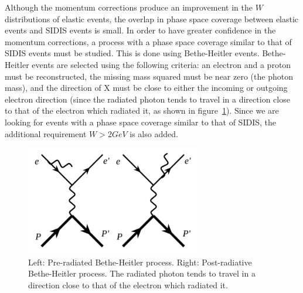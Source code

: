 Although the momentum corrections produce an improvement in the $W$ distributions of elastic events, the overlap in phase space coverage between elastic events and SIDIS events is small.
In order to have greater confidence in the momentum corrections, a process with a phase space coverage similar to that of SIDIS events must be studied.
This is done using Bethe-Heitler events.
Bethe-Heitler events are selected using the following criteria: an electron and a proton must be reconstructed, the missing mass squared must be near zero (the photon mass), and the direction of X must be close to either the incoming or outgoing electron direction (since the radiated photon tends to travel in a direction close to that of the electron which radiated it, as shown in figure~\ref{fig:BetheHeitlerDiagrams}).
Since we are looking for events with a phase space coverage similar to that of SIDIS, the additional requirement $W > 2 GeV$ is also added.
%
\begin{figure}[htp]
\centering
\includegraphics[width=3in]{figures/BetheHeitlerDiagrams.png}
\caption{Left: Pre-radiated Bethe-Heitler process. Right: Post-radiative Bethe-Heitler process. The radiated photon tends to travel in a direction close to that of the electron which radiated it.}
\label{fig:BetheHeitlerDiagrams}
\end{figure}
%

